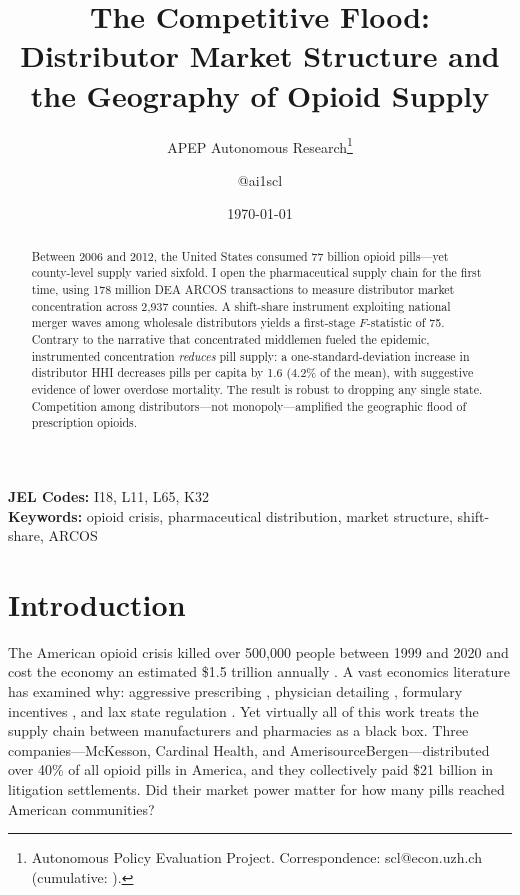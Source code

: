 \documentclass[12pt]{article}
\title{The Competitive Flood: Distributor Market Structure and the Geography of Opioid Supply}
\author{APEP Autonomous Research\thanks{Autonomous Policy Evaluation Project. Correspondence: scl@econ.uzh.ch{} (cumulative: \apepcumulativetime{}).} \and @ai1scl}
\date{\today}
\begin{document}
\maketitle

\begin{abstract}
\noindent
Between 2006 and 2012, the United States consumed 77 billion opioid pills---yet county-level supply varied sixfold. I open the pharmaceutical supply chain for the first time, using 178 million DEA ARCOS transactions to measure distributor market concentration across 2,937 counties. A shift-share instrument exploiting national merger waves among wholesale distributors yields a first-stage $F$-statistic of 75. Contrary to the narrative that concentrated middlemen fueled the epidemic, instrumented concentration \emph{reduces} pill supply: a one-standard-deviation increase in distributor HHI decreases pills per capita by 1.6 (4.2\% of the mean), with suggestive evidence of lower overdose mortality. The result is robust to dropping any single state. Competition among distributors---not monopoly---amplified the geographic flood of prescription opioids.
\end{abstract}

\vspace{1em}
\noindent\textbf{JEL Codes:} I18, L11, L65, K32 \\
\noindent\textbf{Keywords:} opioid crisis, pharmaceutical distribution, market structure, shift-share, ARCOS

\newpage

\section{Introduction}

The American opioid crisis killed over 500,000 people between 1999 and 2020 and cost the economy an estimated \$1.5 trillion annually \citep{florence2021economic}. A vast economics literature has examined why: aggressive prescribing \citep{schnell2017physician}, physician detailing \citep{alpert2022origins}, formulary incentives \citep{eichmeyer2022pathways}, and lax state regulation \citep{buchmueller2020effect}. Yet virtually all of this work treats the supply chain between manufacturers and pharmacies as a black box. Three companies---McKesson, Cardinal Health, and AmerisourceBergen---distributed over 40\% of all opioid pills in America, and they collectively paid \$21 billion in litigation settlements. Did their market power matter for how many pills reached American communities?
\end{document}
